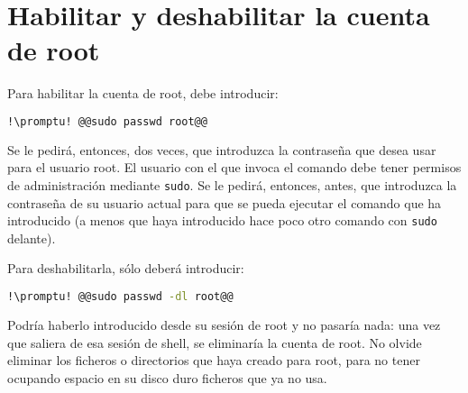 \section{Habilitar y deshabilitar la cuenta de root}\label{sec:root-hab}
Para habilitar la cuenta de root, debe introducir:

\begin{lstlisting}[gobble=2,language=bash,style=bashinteract,escapechar=!]
  !\promptu! @@sudo passwd root@@
\end{lstlisting}

\noindent Se le pedirá, entonces, dos veces, que introduzca la contraseña que desea usar para el usuario root.
El usuario con el que invoca el comando debe tener permisos de administración mediante \lstinline!sudo!. Se le
pedirá, entonces, antes, que introduzca la contraseña de su usuario actual para que se pueda ejecutar el comando
que ha introducido (a menos que haya introducido hace poco otro comando con \lstinline+sudo+ delante).

Para deshabilitarla, sólo deberá introducir:

\begin{lstlisting}[gobble=2,language=bash,style=bashinteract,escapechar=!]
  !\promptu! @@sudo passwd -dl root@@
\end{lstlisting}

\noindent Podría haberlo introducido desde su sesión de root y no pasaría nada: una vez que saliera de esa
sesión de shell, se eliminaría la cuenta de root. No olvide eliminar los ficheros o directorios que haya creado
para root, para no tener ocupando espacio en su disco duro ficheros que ya no usa.
